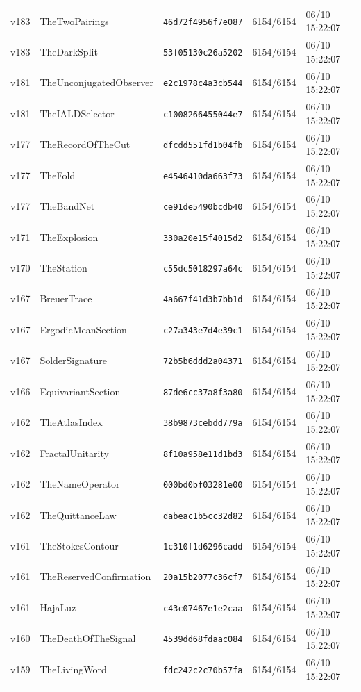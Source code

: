 \documentclass[11pt]{article}
\theoremstyle{definition}\newtheorem{deriv}{Derivation}
\begin{document}
{\begin{longtable}{@{}lllll@{}}
v183 & TheTwoPairings & \texttt{46d72f4956f7e087} & 6154/6154 & 06/10 15:22:07 \\
v183 & TheDarkSplit & \texttt{53f05130c26a5202} & 6154/6154 & 06/10 15:22:07 \\
v181 & TheUnconjugatedObserver & \texttt{e2c1978c4a3cb544} & 6154/6154 & 06/10 15:22:07 \\
v181 & TheIALDSelector & \texttt{c1008266455044e7} & 6154/6154 & 06/10 15:22:07 \\
v177 & TheRecordOfTheCut & \texttt{dfcdd551fd1b04fb} & 6154/6154 & 06/10 15:22:07 \\
v177 & TheFold & \texttt{e4546410da663f73} & 6154/6154 & 06/10 15:22:07 \\
v177 & TheBandNet & \texttt{ce91de5490bcdb40} & 6154/6154 & 06/10 15:22:07 \\
v171 & TheExplosion & \texttt{330a20e15f4015d2} & 6154/6154 & 06/10 15:22:07 \\
v170 & TheStation & \texttt{c55dc5018297a64c} & 6154/6154 & 06/10 15:22:07 \\
v167 & BreuerTrace & \texttt{4a667f41d3b7bb1d} & 6154/6154 & 06/10 15:22:07 \\
v167 & ErgodicMeanSection & \texttt{c27a343e7d4e39c1} & 6154/6154 & 06/10 15:22:07 \\
v167 & SolderSignature & \texttt{72b5b6ddd2a04371} & 6154/6154 & 06/10 15:22:07 \\
v166 & EquivariantSection & \texttt{87de6cc37a8f3a80} & 6154/6154 & 06/10 15:22:07 \\
v162 & TheAtlasIndex & \texttt{38b9873cebdd779a} & 6154/6154 & 06/10 15:22:07 \\
v162 & FractalUnitarity & \texttt{8f10a958e11d1bd3} & 6154/6154 & 06/10 15:22:07 \\
v162 & TheNameOperator & \texttt{000bd0bf03281e00} & 6154/6154 & 06/10 15:22:07 \\
v162 & TheQuittanceLaw & \texttt{dabeac1b5cc32d82} & 6154/6154 & 06/10 15:22:07 \\
v161 & TheStokesContour & \texttt{1c310f1d6296cadd} & 6154/6154 & 06/10 15:22:07 \\
v161 & TheReservedConfirmation & \texttt{20a15b2077c36cf7} & 6154/6154 & 06/10 15:22:07 \\
v161 & HajaLuz & \texttt{c43c07467e1e2caa} & 6154/6154 & 06/10 15:22:07 \\
v160 & TheDeathOfTheSignal & \texttt{4539dd68fdaac084} & 6154/6154 & 06/10 15:22:07 \\
v159 & TheLivingWord & \texttt{fdc242c2c70b57fa} & 6154/6154 & 06/10 15:22:07 \\

\end{longtable}}
\end{document}
